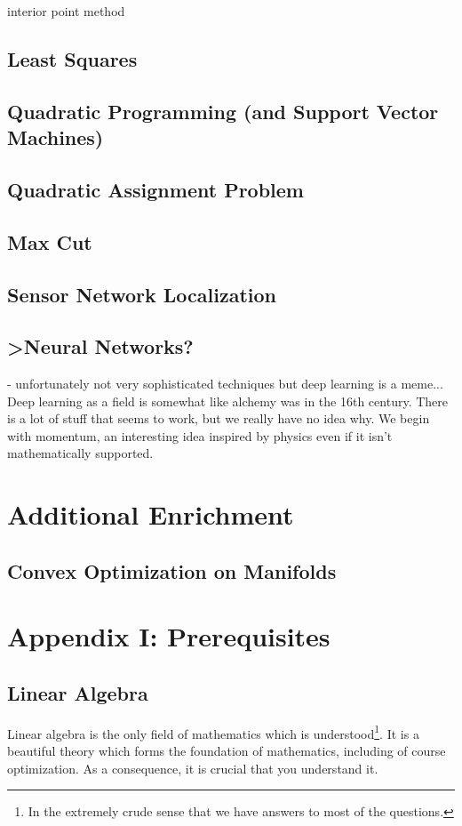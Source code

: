 \documentclass[11pt]{article}
\numberwithin{equation}{section}
\theoremstyle{definition}
\begin{document}
interior point method
\subsection{Least Squares}
\subsection{Quadratic Programming (and Support Vector Machines)}
\subsection{Quadratic Assignment Problem}
\subsection{Max Cut}
\subsection{Sensor Network Localization}
\subsection{>Neural Networks?}
- unfortunately not very sophisticated techniques but deep learning is a meme... Deep learning as a field is somewhat like alchemy was in the 16th century. There is a lot of stuff that seems to work, but we really have no idea why. We begin with momentum, an interesting idea inspired by physics even if it isn't mathematically supported.
\section{Additional Enrichment}
\subsection{Convex Optimization on Manifolds}
\appendix
\section{Appendix I: Prerequisites}
\subsection{Linear Algebra}
Linear algebra is the only field of mathematics which is understood\footnote{In the extremely crude sense that we have answers to most of the questions.}. It is a beautiful theory which forms the foundation of mathematics, including of course optimization. As a consequence, it is crucial that you understand it.
\end{document}
